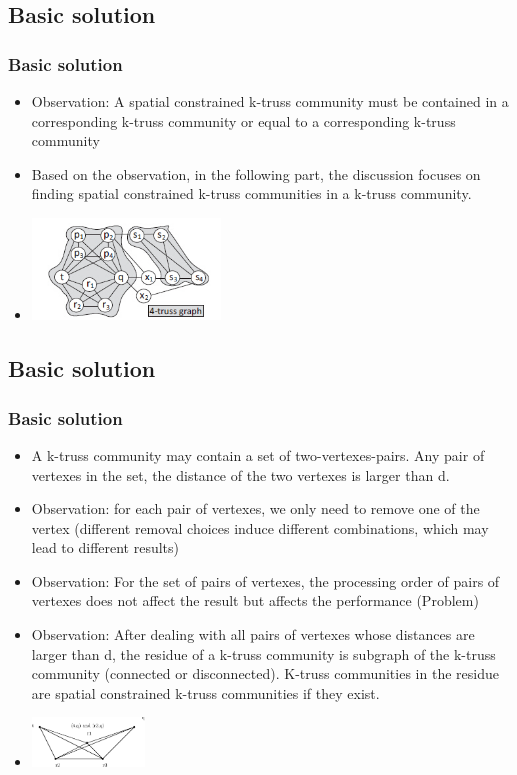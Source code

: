 \documentclass{beamer}
\begin{document}
\subsection{Basic solution}
\begin{frame}
\frametitle{Basic solution}
\begin{itemize}
\item Observation: A spatial constrained k-truss community must be contained in a corresponding k-truss community or equal to a corresponding k-truss community 
\item Based on the observation, in the following part, the discussion focuses on finding spatial constrained k-truss communities in a k-truss community.
\item \includegraphics[width=5cm]{trusssample.jpg}
\end{itemize}
\end{frame}

\subsection{Basic solution}
\begin{frame}
\frametitle{Basic solution}
\begin{itemize}
\item A k-truss community may contain a set of two-vertexes-pairs. Any pair of vertexes in the set, the distance of the two vertexes is larger than d.
\item Observation: for each pair of vertexes, we only need to remove one of the vertex (different removal choices induce different combinations, which may lead to different results)
\item Observation: For the set of pairs of vertexes, the processing order of pairs of vertexes does not affect the result but affects the performance (Problem)
\item Observation: After dealing with all pairs of vertexes whose distances are larger than d, the residue of a k-truss community is subgraph of the k-truss community (connected or disconnected).
K-truss communities in the residue are spatial constrained k-truss communities if they exist.
\item \includegraphics[width=3cm]{subgraph.eps}
\end{itemize}
\end{frame}
\end{document}
